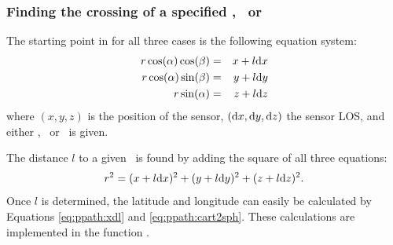 \subsubsection{Finding the crossing of a specified \Rds, \Lat\ or \Lon}
\label{sec:ppath:3dcross}


The starting point in for all three cases is the following
equation system:
\begin{eqnarray}
  r \cos(\alpha) \cos(\beta)  & = & x+l\mathrm{d} x \nonumber \\
  r \cos(\alpha) \sin(\beta)  & = & y+l\mathrm{d} y           \\
  r \sin(\alpha)             & = & z+l\mathrm{d} z \nonumber 
  \label{eq:ppath:rcoss3Da}
\end{eqnarray}
where $(x,y,z)$ is the position of the sensor, $(\mathrm{d} x,\mathrm{d}
y,\mathrm{d} z)$ the sensor LOS, and either \Rds, \Lat\ or \Lon\ is given.

The distance $l$ to a given \Rds\ is found by adding the square of all three
equations:
\begin{equation}
  r^2 = (x+l\mathrm{d} x)^2 + (y+l\mathrm{d} y)^2 + (z+l\mathrm{d} z)^2.
  \label{eq:ppath:rcoss3Db}
\end{equation}
Once $l$ is determined, the latitude and longitude can easily be
calculated by Equations \ref{eq:ppath:xdl} and
\ref{eq:ppath:cart2sph}. These calculations are implemented in the
function .  


